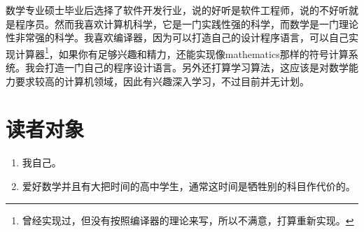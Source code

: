 数学专业硕士毕业后选择了软件开发行业，说的好听是软件工程师，说的不好听就是程序员。然而我喜欢计算机科学，它是一门实践性强的科学，而数学是一门理论性非常强的科学。我喜欢编译器，因为可以打造自己的设计程序语言，可以自己实现计算器\footnote{曾经实现过，但没有按照编译器的理论来写，所以不满意，打算重新实现。}，如果你有足够兴趣和精力，还能实现像mathematics那样的符号计算系统。我会打造一门自己的程序设计语言。另外还打算学习算法，这应该是对数学能力要求较高的计算机领域，因此有兴趣深入学习，不过目前并无计划。

\section{读者对象}

\begin{enumerate}
\item 我自己。
\item 爱好数学并且有大把时间的高中学生，通常这时间是牺牲别的科目作代价的。
\end{enumerate}

